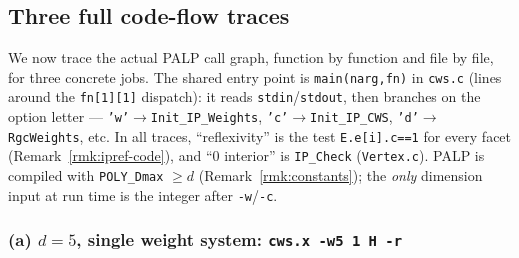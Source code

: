 \documentclass{amsart}
\begin{document}
\subsection{Three full code-flow traces}
\label{sec:algo-traces}

We now trace the actual PALP call graph, function by function and file by
file, for three concrete jobs. The shared entry point is
\texttt{main(narg,fn)} in \texttt{cws.c} (lines around the
\texttt{fn[1][1]} dispatch): it reads \texttt{stdin}/\texttt{stdout}, then
branches on the option letter --- \texttt{'w'}$\to$\texttt{Init\_IP\_Weights},
\texttt{'c'}$\to$\texttt{Init\_IP\_CWS}, \texttt{'d'}$\to$\texttt{RgcWeights},
etc. In all traces, ``reflexivity'' is the test \texttt{E.e[i].c==1} for every
facet (Remark~\ref{rmk:ipref-code}), and ``$0$ interior'' is
\texttt{IP\_Check} (\texttt{Vertex.c}). PALP is compiled with
\texttt{POLY\_Dmax} $\ge d$ (Remark~\ref{rmk:constants}); the \emph{only}
dimension input at run time is the integer after \texttt{-w}/\texttt{-c}.

\subsubsection*{(a) $d=5$, single weight system: \texttt{cws.x -w5 1 H -r}}
\end{document}
